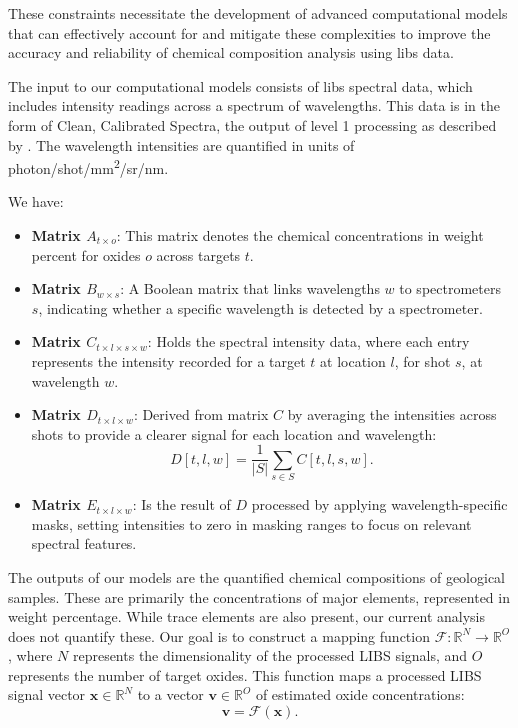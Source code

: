 These constraints necessitate the development of advanced computational models that can effectively account for and mitigate these complexities to improve the accuracy and reliability of chemical composition analysis using \gls{libs} data.

The input to our computational models consists of \gls{libs} spectral data, which includes intensity readings across a spectrum of wavelengths. This data is in the form of Clean, Calibrated Spectra\cite{andersonImprovedAccuracyQuantitative2017}, the output of level 1 processing as described by \citet{wiensPreflightCalibrationInitial2013}. The wavelength intensities are quantified in units of photon/shot/mm\textsuperscript{2}/sr/nm.

We have:

\begin{itemize}
    \item \textbf{Matrix $A_{t \times o}$}: This matrix denotes the chemical concentrations in weight percent for oxides $o$ across targets $t$.
    \item \textbf{Matrix $B_{w \times s}$}: A Boolean matrix that links wavelengths $w$ to spectrometers $s$, indicating whether a specific wavelength is detected by a spectrometer.
    \item \textbf{Matrix $C_{t \times l \times s \times w}$}: Holds the spectral intensity data, where each entry represents the intensity recorded for a target $t$ at location $l$, for shot $s$, at wavelength $w$.
    \item \textbf{Matrix $D_{t \times l \times w}$}: Derived from matrix $C$ by averaging the intensities across shots to provide a clearer signal for each location and wavelength:
    \[
    D[t, l, w] = \frac{1}{|S|} \sum_{s \in S} C[t, l, s, w].
    \]
    \item \textbf{Matrix $E_{t \times l \times w}$}: Is the result of $D$ processed by applying wavelength-specific masks, setting intensities to zero in masking ranges to focus on relevant spectral features.
\end{itemize}

The outputs of our models are the quantified chemical compositions of geological samples. These are primarily the concentrations of major elements, represented in weight percentage. While trace elements are also present, our current analysis does not quantify these.
Our goal is to construct a mapping function $\mathcal{F} : \mathbb{R}^N \rightarrow \mathbb{R}^O$, where $N$ represents the dimensionality of the processed LIBS signals, and $O$ represents the number of target oxides. This function maps a processed LIBS signal vector $\mathbf{x} \in \mathbb{R}^N$ to a vector $\mathbf{v} \in \mathbb{R}^O$ of estimated oxide concentrations:
\[
\mathbf{v} = \mathcal{F}(\mathbf{x}).
\]

